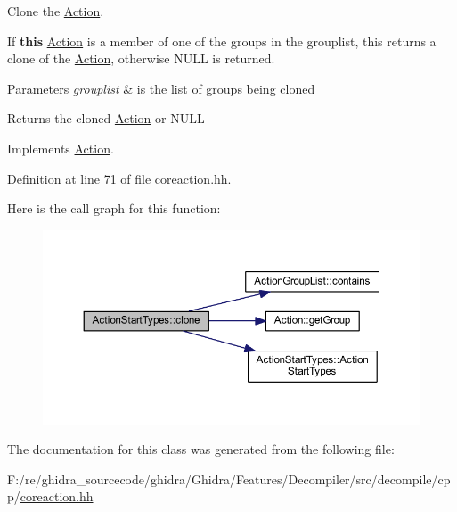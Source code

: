 Clone the \mbox{\hyperlink{class_action}{Action}}. 

If {\bfseries{this}} \mbox{\hyperlink{class_action}{Action}} is a member of one of the groups in the grouplist, this returns a clone of the \mbox{\hyperlink{class_action}{Action}}, otherwise N\+U\+LL is returned. 
\begin{DoxyParams}{Parameters}
{\em grouplist} & is the list of groups being cloned \\
\hline
\end{DoxyParams}
\begin{DoxyReturn}{Returns}
the cloned \mbox{\hyperlink{class_action}{Action}} or N\+U\+LL 
\end{DoxyReturn}


Implements \mbox{\hyperlink{class_action_af8242e41d09e5df52f97df9e65cc626f}{Action}}.



Definition at line 71 of file coreaction.\+hh.

Here is the call graph for this function\+:
\nopagebreak
\begin{figure}[H]
\begin{center}
\leavevmode
\includegraphics[width=350pt]{class_action_start_types_a6779f5bf6578c6318c2a9cc5d7648d0f_cgraph}
\end{center}
\end{figure}


The documentation for this class was generated from the following file\+:\begin{DoxyCompactItemize}
\item 
F\+:/re/ghidra\+\_\+sourcecode/ghidra/\+Ghidra/\+Features/\+Decompiler/src/decompile/cpp/\mbox{\hyperlink{coreaction_8hh}{coreaction.\+hh}}\end{DoxyCompactItemize}
